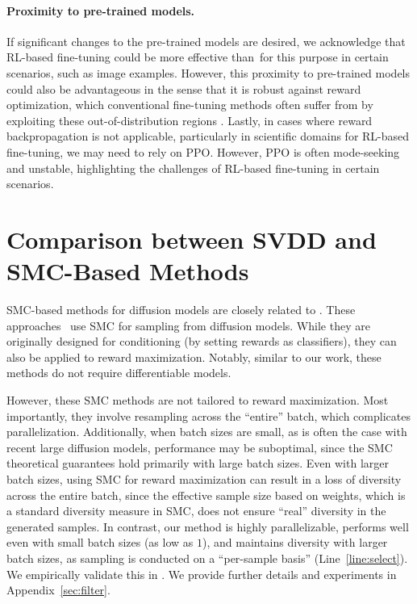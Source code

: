 \vspace{-2mm}
\paragraph{Proximity to pre-trained models.}  If significant changes to the pre-trained models are desired, we acknowledge that RL-based fine-tuning \citep{black2023training,fan2023dpok} could be more effective than \alg\,for this purpose in certain scenarios, such as image examples. However, this proximity to pre-trained models could also be advantageous in the sense that it is robust against reward optimization, which conventional fine-tuning methods often suffer from by exploiting these out-of-distribution regions \citep{uehara2024bridging}.  
Lastly, in cases where reward backpropagation \citep{prabhudesai2023aligning,clark2023directly,uehara2024finetuning} is not applicable, particularly in scientific domains for RL-based fine-tuning, we may need to rely on PPO. However, PPO is often mode-seeking and unstable, highlighting the challenges of RL-based fine-tuning in certain scenarios. 



\vspace{-2mm}
{ \section{Comparison between SVDD and SMC-Based Methods }\label{sec:TDS}
\vspace{-2mm}


SMC-based methods for diffusion models are closely related to \alg. These approaches~\citep{wu2024practical,trippe2022diffusion,dou2024diffusion,phillips2024particle,cardoso2023monte} use SMC \citep{del2014particle} for sampling from diffusion models. While they are originally designed for conditioning (by setting rewards as classifiers), they can also be applied to reward maximization. Notably, similar to our work, these methods do not require differentiable models. 

However, these SMC methods are not tailored to reward maximization. Most importantly, they involve resampling across the ``entire'' batch, which complicates parallelization. Additionally, when batch sizes are small, as is often the case with recent large diffusion models, performance may be suboptimal, since the SMC theoretical guarantees hold primarily with large batch sizes. Even with larger batch sizes, using SMC for reward maximization can result in a loss of diversity across the entire batch, since the effective sample size based on weights, which is a standard diversity measure in SMC, does not ensure ``real'' diversity in the generated samples. In contrast, our method is highly parallelizable, performs well even with small batch sizes (as low as $1$), and maintains diversity with larger batch sizes, as sampling is conducted on a ``per-sample basis'' (Line~\ref{line:select}). We empirically validate this in . We provide further details and experiments in Appendix~\ref{sec:filter}.

} 


